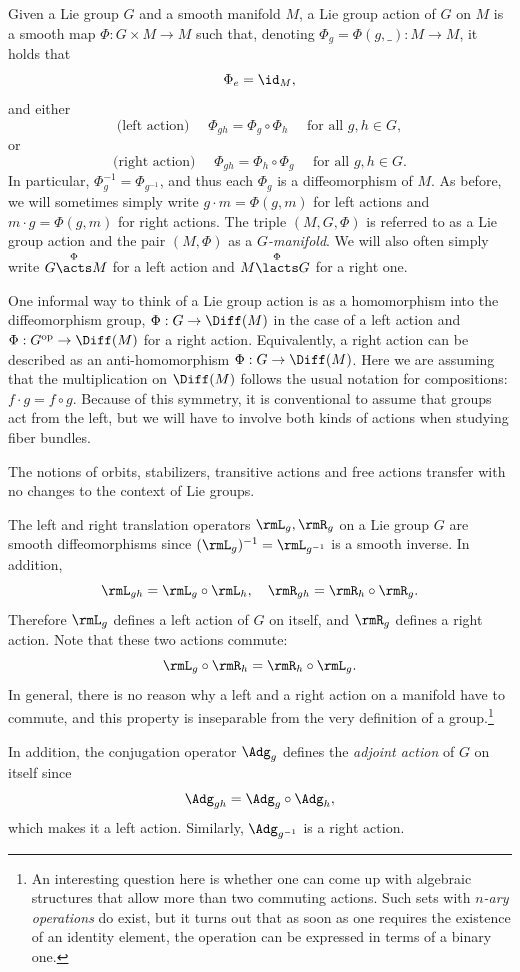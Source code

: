 \begin{defn}
    Given a Lie group $G$ and a smooth manifold $M$, a Lie group action of $G$ on $M$ is a smooth map $\Phi:G\times M\to M$ such that, denoting $\Phi_g=\Phi(g,\_):M\to M$, it holds that \[\Phi_e=\id_M,\] and either
    \[\text{(left action) }\quad \Phi_{gh}=\Phi_g\circ \Phi_h\quad \text{ for all } g,h\in G, \]
    or
    \[\text{(right action) }\quad \Phi_{gh}=\Phi_h\circ \Phi_g\quad \text{ for all } g,h\in G.\]
    In particular, $\Phi_{g}^{-1}=\Phi_{g^{-1}}$, and thus each $\Phi_g$ is a diffeomorphism of $M$. As before, we will sometimes simply write $g\cdot m=\Phi(g,m)$ for left actions and $m\cdot g=\Phi(g,m)$ for right actions. The triple $(M,G,\Phi)$ is referred to as a Lie group action and the pair $(M,\Phi)$ as a \emph{$G$-manifold}. We will also often simply write $G\overset{\Phi}{\acts} M$ for a left action and $M\overset{\Phi}{\lacts} G$ for a right one.
\end{defn}

\begin{rem}
    One informal way to think of a Lie group action is as a homomorphism into the diffeomorphism group, $\Phi:G\to \Diff(M)$ in the case of a left action and $\Phi:G^{\mathrm{op}}\to \Diff(M)$ for a right action. Equivalently, a right action can be described as an anti-homomorphism $\Phi:G\to \Diff(M)$. Here we are assuming that the multiplication on $\Diff(M)$ follows the usual notation for compositions: $f\cdot g=f\circ g$. Because of this symmetry, it is conventional to assume that groups act from the left, but we will have to involve both kinds of actions when studying fiber bundles.
\end{rem}

The notions of orbits, stabilizers, transitive actions and free actions transfer with no changes to the context of Lie groups.

\begin{example}
    The left and right translation operators $\rmL_g,\rmR_g$ on a Lie group $G$ are smooth diffeomorphisms since $(\rmL_g)^{-1}=\rmL_{g^{-1}}$ is a smooth inverse. In addition,
    \[\rmL_{gh}=\rmL_g\circ \rmL_h,\quad \rmR_{gh}=\rmR_h\circ \rmR_g.\]
    Therefore $\rmL_g$ defines a left action of $G$ on itself, and $\rmR_g$ defines a right action. Note that these two actions commute: 
    \[\rmL_g\circ \rmR_h=\rmR_h\circ \rmL_g.\]
    In general, there is no reason why a left and a right action on a manifold have to commute, and this property is inseparable from the very definition of a group.\footnote{An interesting question here is whether one can come up with algebraic structures that allow more than two commuting actions. Such sets with \emph{$n$-ary operations} do exist, but it turns out that as soon as one requires the existence of an identity element, the operation can be expressed in terms of a binary one.}

    In addition, the conjugation operator $\Adg_g$ defines the \emph{adjoint action} of $G$ on itself since 
    \[\Adg_{gh}=\Adg_g\circ \Adg_h,\]
    which makes it a left action. Similarly, $\Adg_{g^{-1}}$ is a right action.
\end{example}

